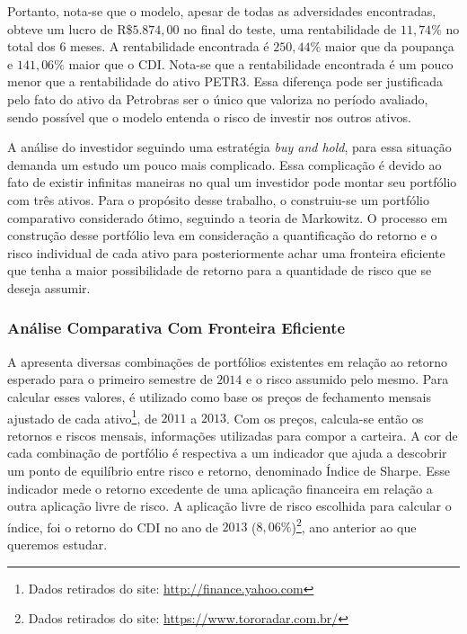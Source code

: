 Portanto, nota-se que o modelo, apesar de todas as adversidades encontradas, obteve um lucro de R\$$5.874,00$ no final do teste, uma rentabilidade de $11,74\%$ no total dos 6 meses. A rentabilidade encontrada é $250,44\%$ maior que da poupança e $141,06\%$ maior que o \acrshort{CDI}. Nota-se que a rentabilidade encontrada é um pouco menor que a rentabilidade do ativo PETR3. Essa diferença pode ser justificada pelo fato do ativo da Petrobras ser o único que valoriza no período avaliado, sendo possível que o modelo entenda o risco de investir nos outros ativos.

A análise do investidor seguindo uma estratégia \emph{buy and hold}, para essa situação demanda um estudo um pouco mais complicado. Essa complicação é devido ao fato de existir infinitas maneiras no qual um investidor pode montar seu portfólio com três ativos. Para o propósito desse trabalho, o construiu-se um portfólio comparativo considerado ótimo, seguindo a teoria de Markowitz. O processo em construção desse portfólio leva em consideração a quantificação do retorno e o risco individual de cada ativo para posteriormente achar uma fronteira eficiente que tenha a maior possibilidade de retorno para a quantidade de risco que se deseja assumir.

\subsubsection{Análise Comparativa Com Fronteira Eficiente}

A  apresenta diversas combinações de portfólios existentes em relação ao retorno esperado para o primeiro semestre de $2014$ e o risco assumido pelo mesmo. Para calcular esses valores, é utilizado como base os preços de fechamento mensais ajustado de cada ativo\footnote{Dados retirados do site: \url{http://finance.yahoo.com}}, de $2011$ a $2013$. Com os preços, calcula-se então os retornos e riscos mensais, informações utilizadas para compor a carteira. A cor de cada combinação de portfólio é respectiva a um indicador que ajuda a descobrir um ponto de equilíbrio entre risco e retorno, denominado Índice de Sharpe. Esse indicador mede o retorno excedente de uma aplicação financeira em relação a outra aplicação livre de risco. A aplicação livre de risco escolhida para calcular o índice, foi o retorno do \acrshort{CDI} no ano de $2013$ ($8,06\%$)\footnote{Dados retirados do site: \url{https://www.tororadar.com.br/}}, ano anterior ao que queremos estudar. 


